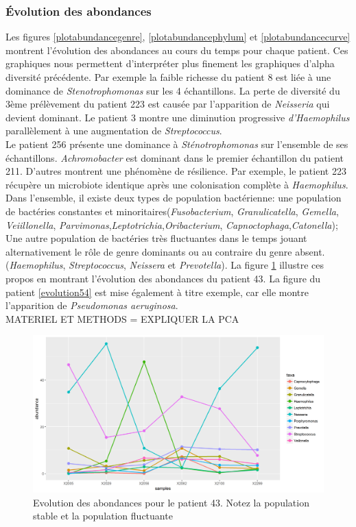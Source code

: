 \documentclass[12pt,a4paper]{article}
\begin{document}
\subsubsection{Évolution des abondances}
Les figures \ref{plotabundancegenre}, \ref{plotabundancephylum} et \ref{plotabundancecurve} montrent l’évolution des abondances au cours du temps pour chaque patient. Ces graphiques nous permettent d’interpréter plus finement les graphiques d’alpha diversité précédente.
Par exemple la faible richesse du patient 8 est liée à une dominance de \textit{Stenotrophomonas} sur les 4 échantillons.
La perte de diversité du 3ème prélèvement du patient 223 est causée par l'apparition de \textit{Neisseria} qui devient dominant.
Le patient 3 montre une diminution progressive \textit{d’Haemophilus} parallèlement à une augmentation de \textit{Streptococcus}. \\
Le patient 256 présente une dominance à \textit{Sténotrophomonas} sur l'ensemble de ses échantillons. \textit{Achromobacter} est dominant dans le premier échantillon du patient 211.
D’autres montrent une phénomène de résilience. Par exemple, le patient 223 récupère un microbiote identique après une colonisation complète à \textit{Haemophilus}. \\
Dans l’ensemble, il existe deux types de population bactérienne: une population de bactéries constantes et minoritaires(\textit{Fusobacterium}, \textit{Granulicatella}, \textit{Gemella}, \textit{Veiillonella}, \textit{Parvimonas},\textit{Leptotrichia},\textit{Oribacterium}, \textit{Capnoctophaga},\textit{Catonella}); Une autre population de bactéries très fluctuantes dans le temps jouant alternativement le rôle de genre dominants ou au contraire du genre absent. (\textit{Haemophilus}, \textit{Streptococcus}, \textit{Neissera} et \textit{Prevotella}).
La figure \ref{evolution43} illustre ces propos en montrant l'évolution des abondances du patient 43.
La figure du patient \ref{evolution54} est mise également à titre exemple, car elle montre l’apparition de \textit{Pseudomonas aeruginosa}. \\
MATERIEL ET METHODS = EXPLIQUER LA PCA 

\begin{figure}
\begin{center}
\includegraphics[scale=0.60]{img/curve_043.png}\hfill
\end{center}
\caption{Evolution des abondances pour le patient 43. Notez la population stable et la population fluctuante}
\label{evolution43}
\end{figure}
\end{document}
